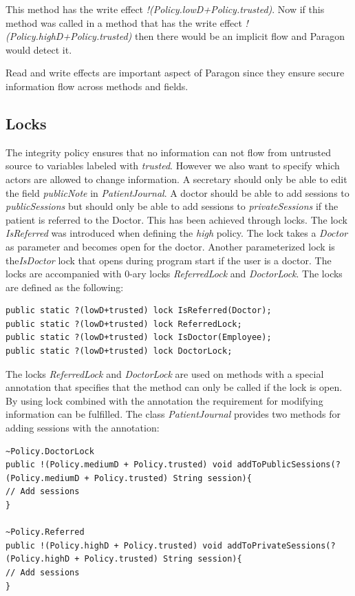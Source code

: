 This method has the write effect \emph{!(Policy.lowD+Policy.trusted)}. Now if this method was called in a method that has the write effect \emph{!(Policy.highD+Policy.trusted)} then there would be an implicit flow and Paragon would detect it.

Read and write effects are important aspect of Paragon since they ensure secure information flow across methods and fields.

\subsection{Locks}
The integrity policy ensures that no information can not flow from untrusted source to variables labeled with \emph{trusted}. However we also want to specify which actors are allowed to change information. A secretary should only be able to edit the field \emph{publicNote} in \emph{PatientJournal}. A doctor should be able to add sessions to \emph{publicSessions} but should only be able to add sessions to \emph{privateSessions} if the patient is referred to the Doctor. This has been achieved through locks. The lock \emph{IsReferred} was introduced when defining the \emph{high} policy. The lock takes a \emph{Doctor} as parameter and becomes open for the doctor. Another parameterized lock is the\emph{IsDoctor} lock that opens during program start if the user is a doctor. The locks are accompanied with 0-ary locks \emph{ReferredLock} and \emph{DoctorLock}. The locks are defined as the following: 

\begin{lstlisting}
public static ?(lowD+trusted) lock IsReferred(Doctor); 
public static ?(lowD+trusted) lock ReferredLock;
public static ?(lowD+trusted) lock IsDoctor(Employee);
public static ?(lowD+trusted) lock DoctorLock;
\end{lstlisting}

The locks \emph{ReferredLock} and \emph{DoctorLock} are used on methods with a special annotation that specifies that the method can only be called if the lock is open. By using lock combined with the annotation the requirement for modifying information can be fulfilled. The class \emph{PatientJournal} provides two methods for adding sessions with the annotation:

\begin{lstlisting}
~Policy.DoctorLock
public !(Policy.mediumD + Policy.trusted) void addToPublicSessions(?(Policy.mediumD + Policy.trusted) String session){
// Add sessions
} 

~Policy.Referred
public !(Policy.highD + Policy.trusted) void addToPrivateSessions(?(Policy.highD + Policy.trusted) String session){
// Add sessions
} 	
\end{lstlisting}  

